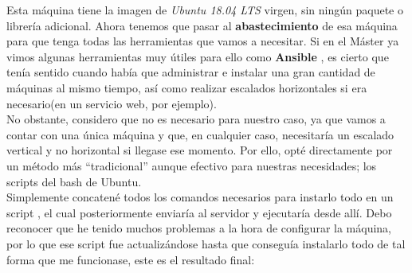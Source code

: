 \documentclass[11pt,fleqn]{book} %
\begin{document}
Esta máquina tiene la imagen de \textit{Ubuntu 18.04 LTS} virgen, sin ningún paquete o librería adicional. Ahora tenemos que pasar al \textbf{abastecimiento} de esa máquina para que tenga todas las herramientas que vamos a necesitar. Si en el Máster ya vimos algunas herramientas muy útiles para ello como \textbf{Ansible} \cite{article:ansible}, es cierto que tenía sentido cuando había que administrar e instalar una gran cantidad de máquinas al mismo tiempo, así como realizar escalados horizontales si era necesario(en un servicio web, por ejemplo). \\

No obstante, considero que no es necesario para nuestro caso, ya que vamos a contar con una única máquina y que, en cualquier caso, necesitaría un escalado vertical y no horizontal si llegase ese momento. Por ello, opté directamente por un método más ``tradicional'' aunque efectivo para nuestras necesidades; los scripts del bash de Ubuntu. \\

Simplemente concatené todos los comandos necesarios para instarlo todo en un script , el cual posteriormente enviaría al servidor y ejecutaría desde allí. Debo reconocer que he tenido muchos problemas a la hora de configurar la máquina, por lo que ese script fue actualizándose hasta que conseguía instalarlo todo de tal forma que me funcionase, este es el resultado final: \\
\end{document}
